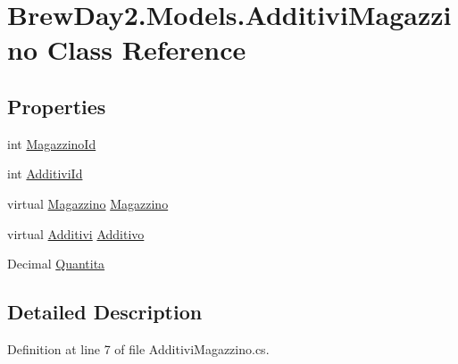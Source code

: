\hypertarget{class_brew_day2_1_1_models_1_1_additivi_magazzino}{}\section{Brew\+Day2.\+Models.\+Additivi\+Magazzino Class Reference}
\label{class_brew_day2_1_1_models_1_1_additivi_magazzino}
\subsection*{Properties}
\begin{DoxyCompactItemize}
\item 
int \mbox{\hyperlink{class_brew_day2_1_1_models_1_1_additivi_magazzino_ab2f88243c42c08091ab0cb76b5a45ea9}{Magazzino\+Id}}
\item 
int \mbox{\hyperlink{class_brew_day2_1_1_models_1_1_additivi_magazzino_a9726c38b19ce6cc5976e8faabf515398}{Additivi\+Id}}
\item 
virtual \mbox{\hyperlink{class_brew_day2_1_1_models_1_1_magazzino}{Magazzino}} \mbox{\hyperlink{class_brew_day2_1_1_models_1_1_additivi_magazzino_ad84a45b2cd55259b4514c1a803107700}{Magazzino}}
\item 
virtual \mbox{\hyperlink{class_brew_day2_1_1_models_1_1_additivi}{Additivi}} \mbox{\hyperlink{class_brew_day2_1_1_models_1_1_additivi_magazzino_a3ab677bf8f6046f60622a5b5b4b5f321}{Additivo}}
\item 
Decimal \mbox{\hyperlink{class_brew_day2_1_1_models_1_1_additivi_magazzino_a481acc906575d81e68a65412635cfa5c}{Quantita}}
\end{DoxyCompactItemize}


\subsection{Detailed Description}


Definition at line 7 of file Additivi\+Magazzino.\+cs.



